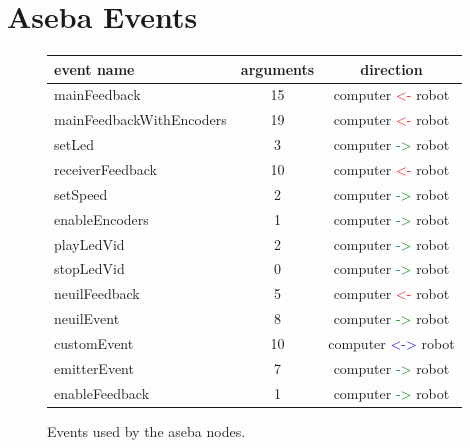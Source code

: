 \documentclass[a4paper,11pt]{report}
\begin{document}
\chapter{Aseba Events}\label{sec:asebaEvents}
\begin{figure}[H]
\begin{center}
\begin{tabular}{|l|c|c|}
   \hline
   \textbf{event name} & \textbf{arguments} & \textbf{direction}\\
   \hline
   \hline
   mainFeedback & 15 & computer \textcolor{red}{<-} robot \\
   \hline
   mainFeedbackWithEncoders & 19 & computer \textcolor{red}{<-} robot \\
   \hline
   setLed & 3 & computer \textcolor{green}{->} robot \\
   \hline
   receiverFeedback & 10 & computer \textcolor{red}{<-} robot \\
   \hline
   setSpeed & 2 & computer \textcolor{green}{->} robot \\
   \hline
   enableEncoders & 1 & computer \textcolor{green}{->} robot \\
   \hline
   playLedVid & 2 & computer \textcolor{green}{->} robot \\
   \hline
   stopLedVid & 0 & computer \textcolor{green}{->} robot \\
   \hline
   neuilFeedback & 5 & computer \textcolor{red}{<-} robot \\
   \hline
   neuilEvent & 8 & computer \textcolor{green}{->} robot \\
   \hline
   customEvent & 10 & computer \textcolor{blue}{<->} robot \\
   \hline
   emitterEvent & 7 & computer \textcolor{green}{->} robot \\
   \hline
   enableFeedback & 1 & computer \textcolor{green}{->} robot \\
   \hline
\end{tabular}
\end{center}
\label{tab:event}
\caption{Events used by the aseba nodes.}
\end{figure}

\newpage
\end{document}

